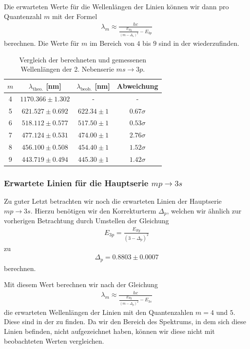 Die erwarteten Werte für die Wellenlängen der Linien können wir dann pro Quantenzahl $m$ mit der Formel
\begin{align}
  \lambda_m \approx \frac{hc}{\frac{E_{Ry}}{(m - \Delta_s)^2} - E_{3p}}
\end{align}
berechnen. Die Werte für $m$ im Bereich von $4$ bis $9$ sind in der  wiederzufinden.

\begin{table}[H]
  \centering
  \caption{Vergleich der berechneten und gemessenen Wellenlängen der 2. Nebenserie $ms \to 3p$.}
  \vspace*{0.5em}
  \begin{tabular}{c c c c}
      \hline
      $m$ & $\lambda_{\text{theo.}}$ [nm] & $\lambda_{\text{beob.}}$ [nm] & Abweichung \\
      \hline
      4  & $1170.366 \pm 1.302$ & -     & -     \\
      5  & $621.527 \pm 0.692$  & $622.34 \pm 1$ & $0.67\sigma$ \\
      6  & $518.112 \pm 0.577$  & $517.50 \pm 1$ & $0.53\sigma$ \\
      7  & $477.124 \pm 0.531$  & $474.00 \pm 1$ & $2.76\sigma$ \\
      8  & $456.100 \pm 0.508$  & $454.40 \pm 1$ & $1.52\sigma$ \\
      9  & $443.719 \pm 0.494$  & $445.30 \pm 1$ & $1.42\sigma$ \\
      \hline
  \end{tabular}
  \label{tab:wellenlaengen_2ns}
\end{table}

\subsubsection*{Erwartete Linien für die Hauptserie $mp \to 3s$}

Zu guter Letzt betrachten wir noch die erwarteten Linien der Hauptserie $mp \to 3s$. Hierzu benötigen wir den Korrekturterm $\Delta_p$, welchen wir ähnlich zur vorherigen Betrachtung durch Umstellen der Gleichung
\begin{align}
  E_{3p} = \frac{E_{Ry}}{(3 - \Delta_p)^2}
\end{align}
zu
\begin{align}
  \Delta_p = 0.8803 \pm 0.0007
\end{align}
berechnen.

Mit diesem Wert berechnen wir nach der Gleichung
\begin{align}
  \lambda_m \approx \frac{hc}{\frac{E_{Ry}}{(m - \Delta_p)^2} - E_{3s}}
\end{align}
die erwarteten Wellenlängen der Linien mit den Quantenzahlen $m = 4$ und $5$. Diese sind in der  zu finden. Da wir den Bereich des Spektrums, in dem sich diese Linien befinden, nicht aufgezeichnet haben, können wir diese nicht mit beobachteten Werten vergleichen.

